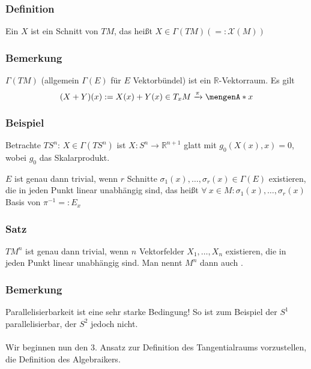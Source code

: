 \subsubsection[Definition: Vektorfeld]{Definition}
\label{ssub:141}
Ein  $X$ ist ein Schnitt von $TM$, das heißt $X\in \Gamma(TM) (=: \mathcal{X}(M))$

\subsubsection[Bemerkung: Vektorraumstruktur des $\Gamma(E)$]{Bemerkung}
\label{ssub:142}
$\Gamma(TM)$ (allgemein $\Gamma(E)$ für $E$ Vektorbündel) ist ein $\mathds{R}$-Vektorraum. Es gilt 
\[
(X + Y)(x) := X(x) + Y(x) \in T_x M \xrightarrow{\pi} \set{x}
\]

\subsubsection{Beispiel}
\label{ssub:143}
Betrachte $TS^n$:
$X\in \Gamma(TS^n)$ ist $X:S^n \to \mathds{R}^{n+1}$ glatt mit $g_0(X(x),x) = 0$, wobei $g_0$ das Skalarprodukt.

 $E$ ist genau dann trivial, wenn $r$ Schnitte $\sigma_1(x),\ldots,\sigma_r(x)\in \Gamma(E)$ existieren, die in jeden Punkt linear unabhängig sind, das heißt $\forall\ x\in M:\sigma_1(x),\ldots,\sigma_r(x)$ Basis von $\pi^{-1}=: E_x$

\subsubsection[Satz: Parallelisierbarkeit des Tangentialbündels]{Satz}
\label{ssub:144}
$TM^n$ ist genau dann trivial, wenn $n$ Vektorfelder $X_1,\ldots,X_n$ existieren, die in jeden Punkt linear unabhängig sind. Man nennt $M^n$ dann auch .

\subsubsection{Bemerkung}
\label{ssub:145}
Parallelisierbarkeit ist eine sehr starke Bedingung! So ist zum Beispiel der $S^1$ parallelisierbar, der $S^2$ jedoch nicht.
\\
\\
Wir beginnen nun den 3. Ansatz zur Definition des Tangentialraums vorzustellen, die Definition des Algebraikers.

